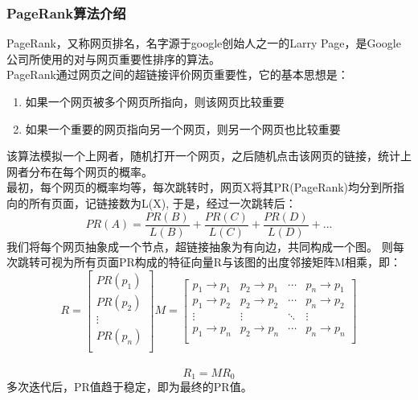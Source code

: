 \documentclass[a4paper,UTF8]{article}
\numberwithin{equation}{section}
\begin{document}
\subsubsection{PageRank算法介绍}
PageRank，又称网页排名，名字源于google创始人之一的Larry Page，是Google公司所使用的对与网页重要性排序的算法。\\
PageRank通过网页之间的超链接评价网页重要性，它的基本思想是：\\
\begin{enumerate}[1)]
    \item 如果一个网页被多个网页所指向，则该网页比较重要
    \item 如果一个重要的网页指向另一个网页，则另一个网页也比较重要
\end{enumerate}
该算法模拟一个上网者，随机打开一个网页，之后随机点击该网页的链接，统计上网者分布在每个网页的概率。\\
最初，每个网页的概率均等，每次跳转时，网页X将其PR(PageRank)均分到所指向的所有页面，记链接数为L(X),
于是，经过一次跳转后：\\
$$
PR(A)=\frac{PR(B)}{L(B)}+\frac{PR(C)}{L(C)}+\frac{PR(D)}{L(D)}+...
$$
我们将每个网页抽象成一个节点，超链接抽象为有向边，共同构成一个图。
则每次跳转可视为所有页面PR构成的特征向量R与该图的出度邻接矩阵M相乘，即：\\
$$R=
\begin{bmatrix}
    PR(p_1) \\
    PR(p_2)\\
    \vdots\\
    PR(p_n)\\
\end{bmatrix}
M=
\begin{bmatrix}
    p_1 \rightarrow p_1 & p_2 \rightarrow p_1 & \cdots & p_n \rightarrow p_1\\
    p_1 \rightarrow p_2 & p_2 \rightarrow p_2 & \cdots & p_n \rightarrow p_2\\
    \vdots & \vdots & \ddots & \vdots\\
    p_1 \rightarrow p_n & p_2 \rightarrow p_n & \cdots & p_n \rightarrow p_n\\
\end{bmatrix}
$$
\\
$$
R_1=M R_0
$$
多次迭代后，PR值趋于稳定，即为最终的PR值。
\end{document}
